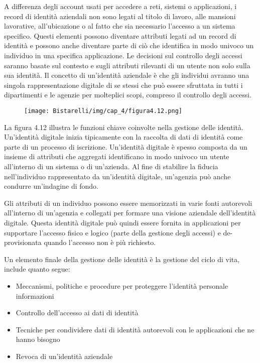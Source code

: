 \singlespacing

A differenza degli account usati per accedere a reti, sistemi o applicazioni, i record di identità aziendali non sono legati al titolo di lavoro, alle mansioni lavorative, all'ubicazione o al fatto che sia necessario l'accesso a un sistema specifico. Questi elementi possono diventare attributi legati ad un record di identità e possono anche diventare parte di ciò che identifica in modo univoco un individuo in una specifica applicazione. Le decisioni sul controllo degli accessi saranno basate sul contesto e sugli attributi rilevanti di un utente non solo sulla sua identità. Il concetto di un'identità aziendale è che gli individui avranno una singola rappresentazione digitale di se stessi che può essere sfruttata in tutti i dipartimenti e le agenzie per molteplici scopi, compreso il controllo degli accessi.

\singlespacing

\begin{figure}[H]
	\centering
    \texttt{[image: Bistarelli/img/cap\_4/figura4.12.png]}
\end{figure}

La figura 4.12 illustra le funzioni chiave coinvolte nella gestione delle identità. Un'identità digitale inizia tipicamente con la raccolta di dati di identità come parte di un processo di iscrizione. Un'identità digitale è spesso composta da un insieme di attributi che aggregati identificano in modo univoco un utente all'interno di un sistema o di un'azienda. Al fine di stabilire la fiducia nell'individuo rappresentato da un'identità digitale, un'agenzia può anche condurre un'indagine di fondo.

\singlespacing

Gli attributi di un individuo possono essere memorizzati in varie fonti autorevoli all'interno di un'agenzia e collegati per formare una visione aziendale dell'identità digitale. Questa identità digitale può quindi essere fornita in applicazioni per supportare l'accesso fisico e logico (parte della gestione degli accessi) e de-provisionata quando l'accesso non è più richiesto.

\singlespacing

Un elemento finale della gestione delle identità è la gestione del ciclo di vita, include quanto segue:

\begin{itemize}
    \item Meccanismi, politiche e procedure per proteggere l'identità personale informazioni
    
    \item Controllo dell'accesso ai dati di identità
    
    \item Tecniche per condividere dati di identità autorevoli con le applicazioni che ne hanno bisogno

    \item Revoca di un'identità aziendale
\end{itemize}
\newpage
